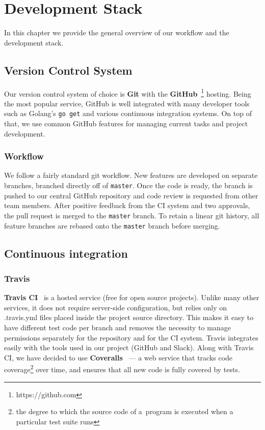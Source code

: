 \chapter{Development Stack}

In this chapter we provide the general overview of our workflow and
the development stack.

\section{Version Control System}
Our version control system of choice is \textbf{Git} with the
\textbf{GitHub}~\footnote{https://github.com} hosting. Being the most popular
service, GitHub is well integrated  with many developer tools such as Golang’s
\texttt{go get} and various continuous integration systems. On top of that,
we use common GitHub features for managing current tasks and project development.

\subsection{Workflow}
We follow a fairly standard git workflow. New features are developed on 
separate branches, branched directly off of \texttt{master}. Once the code
is ready, the branch is pushed to our central GitHub repository and code 
review is requested from other team members. After positive feedback from 
the CI system and two approvals, the pull request is merged to the 
\texttt{master} branch. To retain a linear git history, all feature branches 
are rebased onto the \texttt{master} branch before merging.

\section{Continuous integration}

\subsection{Travis}
\textbf{Travis CI}~\cite{travis} is a hosted service (free for open source 
projects). Unlike many other services, it does not require server-side 
configuration, but relies only on .travis.yml files placed inside 
the project source directory. This makes it easy to have different test 
code per branch and removes the necessity to manage permissions separately 
for the repository and for the CI system. Travis integrates easily with the 
tools used in our project (GitHub and Slack). Along with Travis CI, we have 
decided to use \textbf{Coveralls}~\cite{coveralls} --- a web service that 
tracks code coverage\footnote{the degree to which the source code of a~program 
is executed when a particular test suite runs} over time, and ensures that 
all new code is fully covered by tests.

